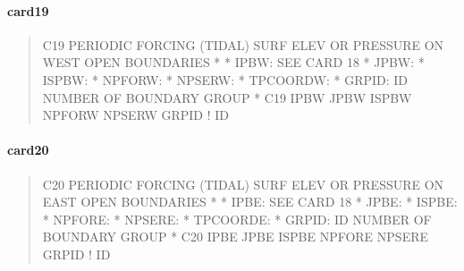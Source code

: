 \documentclass[letterpaper,10pt,english]{sphinxmanual}
\begin{document}
\paragraph{card19}
\label{\detokenize{inputfiles/runcontrol/card19:card19}}\label{\detokenize{inputfiles/runcontrol/card19::doc}}\begin{quote}

\begin{sphinxVerbatim}[commandchars=\\\{\}]
\PYGZhy{}\PYGZhy{}\PYGZhy{}\PYGZhy{}\PYGZhy{}\PYGZhy{}\PYGZhy{}\PYGZhy{}\PYGZhy{}\PYGZhy{}\PYGZhy{}\PYGZhy{}\PYGZhy{}\PYGZhy{}\PYGZhy{}\PYGZhy{}\PYGZhy{}\PYGZhy{}\PYGZhy{}\PYGZhy{}\PYGZhy{}\PYGZhy{}\PYGZhy{}\PYGZhy{}\PYGZhy{}\PYGZhy{}\PYGZhy{}\PYGZhy{}\PYGZhy{}\PYGZhy{}\PYGZhy{}\PYGZhy{}\PYGZhy{}\PYGZhy{}\PYGZhy{}\PYGZhy{}\PYGZhy{}\PYGZhy{}\PYGZhy{}\PYGZhy{}\PYGZhy{}\PYGZhy{}\PYGZhy{}\PYGZhy{}\PYGZhy{}\PYGZhy{}\PYGZhy{}\PYGZhy{}\PYGZhy{}\PYGZhy{}\PYGZhy{}\PYGZhy{}\PYGZhy{}\PYGZhy{}\PYGZhy{}\PYGZhy{}\PYGZhy{}\PYGZhy{}\PYGZhy{}\PYGZhy{}\PYGZhy{}\PYGZhy{}\PYGZhy{}\PYGZhy{}\PYGZhy{}\PYGZhy{}\PYGZhy{}\PYGZhy{}\PYGZhy{}\PYGZhy{}\PYGZhy{}\PYGZhy{}\PYGZhy{}\PYGZhy{}\PYGZhy{}\PYGZhy{}\PYGZhy{}\PYGZhy{}
C19 PERIODIC FORCING (TIDAL) SURF ELEV OR PRESSURE ON WEST OPEN BOUNDARIES
*
*  IPBW: SEE CARD 18
*  JPBW:
*  ISPBW:
*  NPFORW:
*  NPSERW:
*  TPCOORDW: 
*  GRPID: ID NUMBER OF BOUNDARY GROUP
*
C19    IPBW    JPBW   ISPBW  NPFORW  NPSERW      GRPID ! ID
\end{sphinxVerbatim}
\end{quote}


\paragraph{card20}
\label{\detokenize{inputfiles/runcontrol/card20:card20}}\label{\detokenize{inputfiles/runcontrol/card20::doc}}\begin{quote}

\begin{sphinxVerbatim}[commandchars=\\\{\}]
\PYGZhy{}\PYGZhy{}\PYGZhy{}\PYGZhy{}\PYGZhy{}\PYGZhy{}\PYGZhy{}\PYGZhy{}\PYGZhy{}\PYGZhy{}\PYGZhy{}\PYGZhy{}\PYGZhy{}\PYGZhy{}\PYGZhy{}\PYGZhy{}\PYGZhy{}\PYGZhy{}\PYGZhy{}\PYGZhy{}\PYGZhy{}\PYGZhy{}\PYGZhy{}\PYGZhy{}\PYGZhy{}\PYGZhy{}\PYGZhy{}\PYGZhy{}\PYGZhy{}\PYGZhy{}\PYGZhy{}\PYGZhy{}\PYGZhy{}\PYGZhy{}\PYGZhy{}\PYGZhy{}\PYGZhy{}\PYGZhy{}\PYGZhy{}\PYGZhy{}\PYGZhy{}\PYGZhy{}\PYGZhy{}\PYGZhy{}\PYGZhy{}\PYGZhy{}\PYGZhy{}\PYGZhy{}\PYGZhy{}\PYGZhy{}\PYGZhy{}\PYGZhy{}\PYGZhy{}\PYGZhy{}\PYGZhy{}\PYGZhy{}\PYGZhy{}\PYGZhy{}\PYGZhy{}\PYGZhy{}\PYGZhy{}\PYGZhy{}\PYGZhy{}\PYGZhy{}\PYGZhy{}\PYGZhy{}\PYGZhy{}\PYGZhy{}\PYGZhy{}\PYGZhy{}\PYGZhy{}\PYGZhy{}\PYGZhy{}\PYGZhy{}\PYGZhy{}\PYGZhy{}\PYGZhy{}\PYGZhy{}
C20 PERIODIC FORCING (TIDAL) SURF ELEV OR PRESSURE ON EAST OPEN BOUNDARIES
*
*  IPBE: SEE CARD 18
*  JPBE:
*  ISPBE:
*  NPFORE:
*  NPSERE:
*  TPCOORDE: 
*  GRPID: ID NUMBER OF BOUNDARY GROUP
*
C20    IPBE    JPBE   ISPBE  NPFORE  NPSERE      GRPID ! ID
\end{sphinxVerbatim}
\end{quote}
\end{document}
